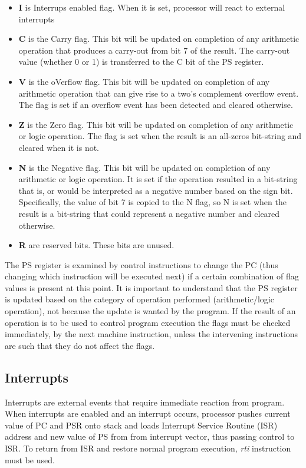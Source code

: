 \documentclass{ol-softwaremanual}
\begin{document}
    \begin{itemize}
        \item \textbf{I} is Interrups enabled flag. When it is set, processor will react to external interrupts
        \item \textbf{C} is the Carry flag. This bit will be updated on completion of any arithmetic operation that produces a
        carry-out from bit 7 of the result. The carry-out value (whether 0 or 1) is transferred to the C bit of
        the PS register.
        \item \textbf{V} is the oVerflow flag. This bit will be updated on completion of any arithmetic operation that can give
        rise to a two's complement overflow event. The flag is set if an overflow event has been detected and
        cleared otherwise.
        \item \textbf{Z} is the Zero flag. This bit will be updated on completion of any arithmetic or logic operation. The flag is
        set when the result is an all-zeros bit-string and cleared when it is not.
        \item \textbf{N} is the Negative flag. This bit will be updated on completion of any arithmetic or logic operation. It is
        set if the operation resulted in a bit-string that is, or would be interpreted as a negative number based
        on the sign bit. Specifically, the value of bit 7 is copied to the N flag, so N is set when the result is a
        bit-string that could represent a negative number and cleared otherwise.
        \item \textbf{R} are reserved bits. These bits are unused.
    \end{itemize}

    The PS register is examined by control instructions to change the PC (thus changing which instruction
    will be executed next) if a certain combination of flag values is present at this point. It is important to
    understand that the PS register is updated based on the category of operation performed (arithmetic/logic
    operation), not because the update is wanted by the program. If the result of an operation is to be used to
    control program execution the flags must be checked immediately, by the next machine instruction, unless
    the intervening instructions are such that they do not affect the flags.

    \subsection{Interrupts}
    Interrupts are external events that require immediate reaction from program. When interrupts are enabled and an interrupt occurs,
    processor pushes current value of PC and PSR onto stack and loads Interrupt Service Routine (ISR) address and new value of PS from from interrupt vector,
    thus passing control to ISR. To return from ISR and restore normal program execution, \emph{rti} instruction must be used.
\end{document}
